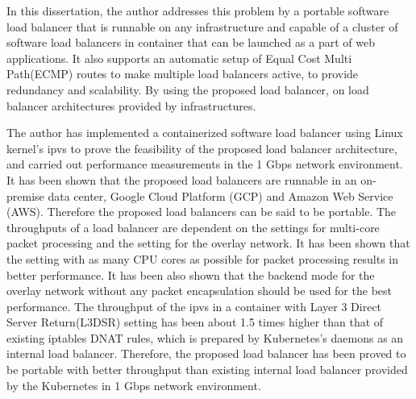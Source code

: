 In this dissertation, the author addresses this problem by  a portable software load balancer that is runnable on any infrastructure  and capable of
 a cluster of software load balancers in container that can be launched as a part of web applications.
It also supports an automatic setup of Equal Cost Multi Path(ECMP) routes to make multiple load balancers active,  to provide redundancy and scalability.
By using the proposed load balancer,  on load balancer architectures provided by infrastructures.

The author has implemented a containerized software load balancer using Linux kernel's ipvs to prove the feasibility of the proposed load balancer architecture, and carried out performance measurements in the 1 Gbps network environment.
It has been shown that the proposed load balancers are runnable in an on-premise data center, Google Cloud Platform (GCP) and Amazon Web Service (AWS).
Therefore the proposed load balancers can be said to be portable.
%
The throughputs of a load balancer are dependent on the settings for multi-core packet processing and the setting for the overlay network.
It has been shown that the setting with as many CPU cores as possible for packet processing results in better performance.
It has been also shown that the backend mode for the overlay network without any packet encapsulation should be used for the best performance.
%
The throughput of the ipvs in a container with Layer 3 Direct Server Return(L3DSR) setting has been about 1.5 times higher than that of existing iptables DNAT rules, which is prepared by Kubernetes's daemons as an internal load balancer.
Therefore, the proposed load balancer has been proved to be portable with better throughput than existing internal load balancer provided by the Kubernetes in 1 Gbps network environment.

